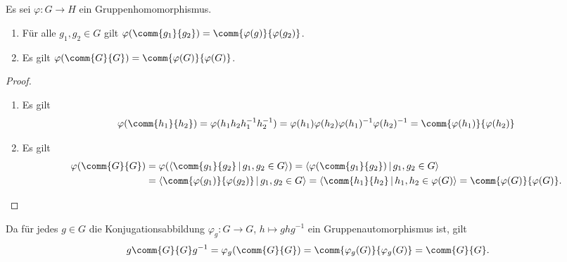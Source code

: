 \subsection{}

\begin{lemma}
  Es sei $\varphi \colon G \to H$ ein Gruppenhomomorphismus.
  \begin{enumerate}
    \item
      Für alle $g_1, g_2 \in G$ gilt $\varphi(\comm{g_1}{g_2}) = \comm{\varphi(g)}{\varphi(g_2)}$.
    \item
      Es gilt $\varphi(\comm{G}{G}) = \comm{\varphi(G)}{\varphi(G)}$.
  \end{enumerate}
\end{lemma}

\begin{proof}
  \begin{enumerate}
    \item
      Es gilt
      \[
          \varphi(\comm{h_1}{h_2})
        = \varphi( h_1 h_2 h_1^{-1} h_2^{-1} )
        = \varphi(h_1) \varphi(h_2) \varphi(h_1)^{-1} \varphi(h_2)^{-1}
        = \comm{ \varphi(h_1) }{ \varphi(h_2) }
      \]
    \item
      Es gilt
      \begin{align*}
           \varphi( \comm{G}{G} )
        &= \varphi( \generated{ \comm{g_1}{g_2} \suchthat g_1, g_2 \in G } )
         = \generated{ \varphi(\comm{g_1}{g_2}) \suchthat g_1, g_2 \in G }
        \\
        &= \generated{ \comm{\varphi(g_1)}{\varphi(g_2)} \suchthat g_1, g_2 \in G }
         = \generated{ \comm{h_1}{h_2} \suchthat h_1, h_2 \in \varphi(G) }
         = \comm{\varphi(G)}{\varphi(G)}.
      \end{align*}
    \qedhere
  \end{enumerate}
\end{proof}

Da für jedes $g \in G$ die Konjugationsabbildung $\varphi_g \colon G \to G$, $h \mapsto ghg^{-1}$ ein Gruppenautomorphismus ist, gilt
\[
    g \comm{G}{G} g^{-1}
  = \varphi_g( \comm{G}{G} )
  = \comm{\varphi_g(G)}{\varphi_g(G)}
  = \comm{G}{G}.
\]



